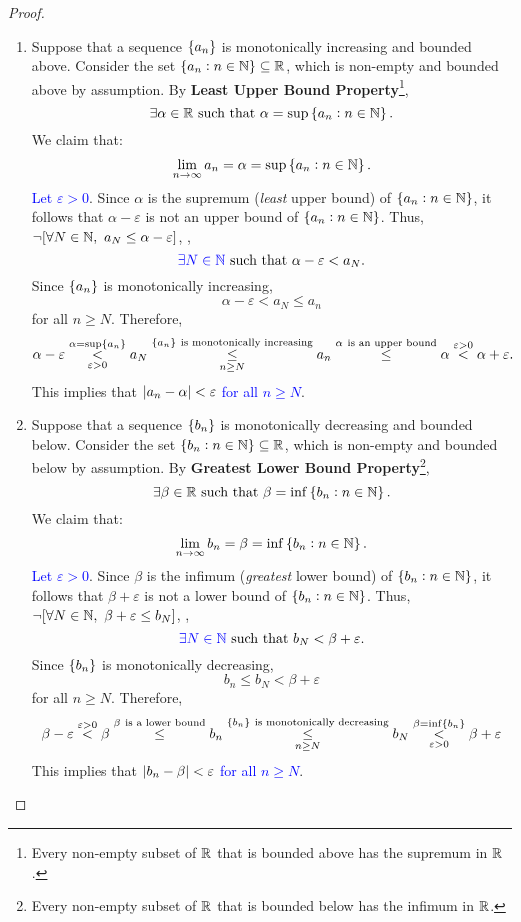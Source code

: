 \documentclass[11pt,openany]{article}
\begin{document}
\begin{proof}
\ \begin{enumerate}[(1)]
	\item Suppose that a sequence $\set{a_n}$ is monotonically increasing and bounded above. Consider the set $\set{a_n:n\in\mathbb{N}}\subseteq\mathbb{R}$, which is non-empty and bounded above by assumption. By \textbf{Least Upper Bound Property}\footnote{Every non-empty subset of $\mathbb{R}$ that is bounded above has the supremum in $\mathbb{R}$.}, \[
	\exists\alpha\in\R\ \text{such that}\ \alpha=\sup\set{a_n:n\in\N}.
	\] We claim that: \[
	\lim\limits_{n\to\infty}a_n=\alpha=\sup\set{a_n:n\in\mathbb{N}}.
	\] \textcolor{blue}{Let $\varepsilon>0$}. Since $\alpha$ is the supremum (\textit{least} upper bound) of $\set{a_n:n\in\mathbb{N}}$,  it follows that $\alpha-\varepsilon$ is not an upper bound of $\set{a_n:n\in\mathbb{N}}$. Thus, $\lnot[\forall N\in\N,\ a_N\leq\alpha-\varepsilon]$, \ie, \[
	\textcolor{blue}{\exists N\in\mathbb{N}}\ \text{such that}\ \alpha-\varepsilon<a_N.
	\] Since $\set{a_n}$ is monotonically increasing, \[
	\alpha-\varepsilon<a_N\leq a_n
	\] for all $n\geq N$. Therefore, \[
	\alpha-\varepsilon\overset{\alpha=\sup\set{a_n}}{\underset{\varepsilon>0}{<}}a_N
	\overset{\set{a_n}\ \text{is monotonically increasing}}{\underset{n\geq N}{\leq}}a_n\overset{\alpha\ \text{is an upper bound}}{\leq}\alpha\overset{\varepsilon>0}{<}\alpha+\varepsilon.
	\] This implies that \textcolor{blue}{$\abs[0]{a_n-\alpha}<\varepsilon$ for all $n\geq N$}.
	\newpage
	\item Suppose that a sequence $\set{b_n}$ is monotonically decreasing and bounded below. Consider the set $\set{b_n:n\in\mathbb{N}}\subseteq\mathbb{R}$, which is non-empty and bounded below by assumption. By \textbf{Greatest Lower Bound Property}\footnote{Every non-empty subset of $\mathbb{R}$ that is bounded below has the infimum in $\mathbb{R}$.}, \[
	\exists\beta\in\R\ \text{such that}\ \beta=\inf\set{b_n:n\in\N}.
	\] We claim that: \[
	\lim\limits_{n\to\infty}b_n=\beta=\inf\set{b_n:n\in\mathbb{N}}.
	\] \textcolor{blue}{Let $\varepsilon>0$}. Since $\beta$ is the infimum (\textit{greatest} lower bound) of $\set{b_n:n\in\mathbb{N}}$,  it follows that $\beta+\varepsilon$ is not a lower bound of $\set{b_n:n\in\mathbb{N}}$. Thus, $\lnot[\forall N\in\mathbb{N},\ \beta+\varepsilon\leq b_N]$, \ie, \[
	\textcolor{blue}{\exists N\in\mathbb{N}}\ \text{such that}\ b_N<\beta+\varepsilon.
	\] Since $\set{b_n}$ is monotonically decreasing, \[
	b_n\leq b_N<\beta+\varepsilon
	\] for all $n\geq N$. Therefore, \[
	\beta-\varepsilon\overset{\varepsilon>0}{<}\beta\overset{\beta\ \text{is a lower bound}}{\leq}b_n\overset{\set{b_n}\ \text{is monotonically decreasing}}{\underset{n\geq N}{\leq}} b_N\overset{\beta=\inf\set{b_n}}{\underset{\varepsilon>0}{<}}\beta+\varepsilon
	\]
	This implies that \textcolor{blue}{$\abs[0]{b_n-\beta}<\varepsilon$ for all $n\geq N$}.
\end{enumerate}
\end{proof}
\end{document}
